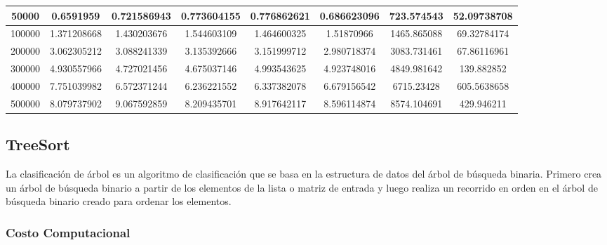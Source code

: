 \documentclass{article}
\begin{document}
\begin{table}[]
\begin{tabular}{|c|c|c|c|c|c|c|c| }
    50000	&0.6591959	    &0.721586943	&0.773604155	&0.776862621	&0.686623096	&723.574543	 	&52.09738708\\ \hline
    100000	&1.371208668	&1.430203676	&1.544603109	&1.464600325	&1.51870966	     &1465.865088	 	&69.32784174\\ \hline
    200000	&3.062305212	&3.088241339	&3.135392666	&3.151999712	&2.980718374	&3083.731461	 	&67.86116961\\ \hline
    300000	&4.930557966	&4.727021456	&4.675037146	&4.993543625	&4.923748016	&4849.981642	 	&139.882852\\ \hline
    400000	&7.751039982	&6.572371244	&6.236221552	&6.337382078	&6.679156542	&6715.23428	 	&605.5638658\\ \hline
    500000	&8.079737902	&9.067592859	&8.209435701	&8.917642117	&8.596114874	&8574.104691	 	&429.946211\\ \hline
        \end{tabular}
    \end{table}

    \subsection{TreeSort}
    La clasificación de árbol es un algoritmo de clasificación que se basa en la estructura de datos del árbol de búsqueda binaria. Primero crea un árbol de búsqueda binario a partir de los elementos de la lista o matriz de entrada y luego realiza un recorrido en orden en el árbol de búsqueda binario creado para ordenar los elementos.
        \subsubsection{Costo Computacional}
\end{document}
